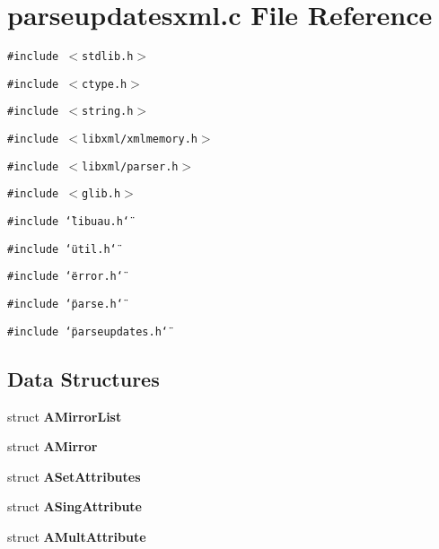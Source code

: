 \section{parseupdatesxml.c File Reference}
\label{parseupdatesxml_8c}
{\tt \#include $<$stdlib.h$>$}\par
{\tt \#include $<$ctype.h$>$}\par
{\tt \#include $<$string.h$>$}\par
{\tt \#include $<$libxml/xmlmemory.h$>$}\par
{\tt \#include $<$libxml/parser.h$>$}\par
{\tt \#include $<$glib.h$>$}\par
{\tt \#include \char`\"{}libuau.h\char`\"{}}\par
{\tt \#include \char`\"{}util.h\char`\"{}}\par
{\tt \#include \char`\"{}error.h\char`\"{}}\par
{\tt \#include \char`\"{}parse.h\char`\"{}}\par
{\tt \#include \char`\"{}parseupdates.h\char`\"{}}\par
\subsection*{Data Structures}
\begin{CompactItemize}
\item 
struct {\bf AMirror\-List}
\item 
struct {\bf AMirror}
\item 
struct {\bf ASet\-Attributes}
\item 
struct {\bf ASing\-Attribute}
\item 
struct {\bf AMult\-Attribute}
\end{CompactItemize}
